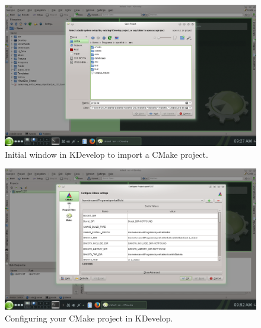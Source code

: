 \begin{figure}[btp]
\begin{center} 
\includegraphics[width=\textwidth]{./figures/kdevelop_1.png}
\caption{Initial window in KDevelop to import a CMake project.}
\label{fig:setup_KDevelop}
\end{center}
\end{figure}

\begin{figure}[btp]
\begin{center} 
\includegraphics[width=\textwidth]{./figures/kdevelop_2.png}
\caption{Configuring your CMake project in KDevelop.}
\label{fig:setup_KDevelop_options}
\end{center}
\end{figure}

